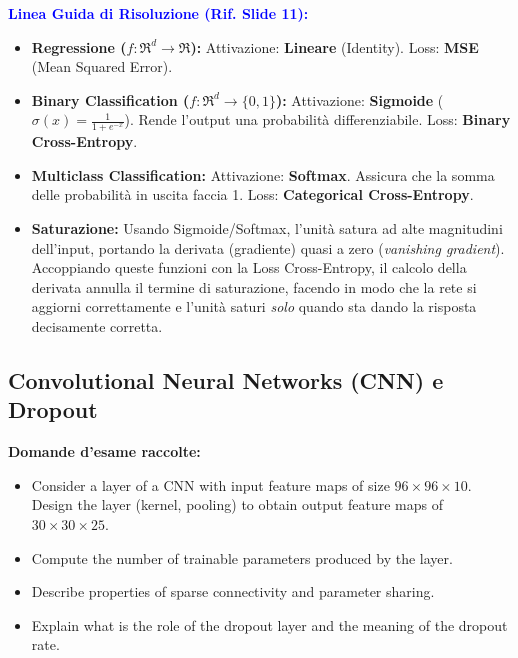 \documentclass[11pt,a4paper]{article}
\begin{document}
\textbf{\textcolor{blue}{Linea Guida di Risoluzione (Rif. Slide 11):}}
\begin{itemize}
    \item \textbf{Regressione ($f: \Re^d \to \Re$):} Attivazione: \textbf{Lineare} (Identity). Loss: \textbf{MSE} (Mean Squared Error).
    \item \textbf{Binary Classification ($f: \Re^d \to \{0,1\}$):} Attivazione: \textbf{Sigmoide} ($\sigma(x) = \frac{1}{1+e^{-x}}$). Rende l'output una probabilità differenziabile. Loss: \textbf{Binary Cross-Entropy}.
    \item \textbf{Multiclass Classification:} Attivazione: \textbf{Softmax}. Assicura che la somma delle probabilità in uscita faccia 1. Loss: \textbf{Categorical Cross-Entropy}.
    \item \textbf{Saturazione:} Usando Sigmoide/Softmax, l'unità satura ad alte magnitudini dell'input, portando la derivata (gradiente) quasi a zero (\textit{vanishing gradient}). Accoppiando queste funzioni con la Loss Cross-Entropy, il calcolo della derivata annulla il termine di saturazione, facendo in modo che la rete si aggiorni correttamente e l'unità saturi \textit{solo} quando sta dando la risposta decisamente corretta.
\end{itemize}

\subsection{Convolutional Neural Networks (CNN) e Dropout}
\textbf{Domande d'esame raccolte:}
\begin{itemize}
    \item Consider a layer of a CNN with input feature maps of size $96 \times 96 \times 10$. Design the layer (kernel, pooling) to obtain output feature maps of $30 \times 30 \times 25$.
    \item Compute the number of trainable parameters produced by the layer.
    \item Describe properties of sparse connectivity and parameter sharing.
    \item Explain what is the role of the dropout layer and the meaning of the dropout rate.
\end{itemize}
\end{document}
